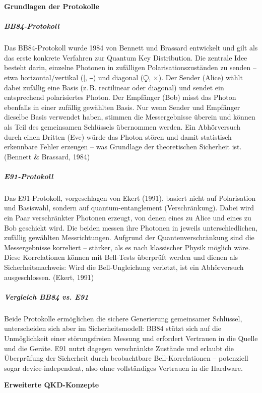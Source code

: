 \vspace{1em}
\noindent\textbf{Grundlagen der Protokolle}

\subparagraph{BB84-Protokoll}
Das BB84-Protokoll wurde 1984 von Bennett und Brassard entwickelt und gilt als das erste konkrete Verfahren zur Quantum Key Distribution. Die zentrale Idee besteht darin, einzelne Photonen in zufälligen Polarisationszuständen zu senden – etwa horizontal/vertikal (|, ⎯) und diagonal (⧬, ×).
Der Sender (Alice) wählt dabei zufällig eine Basis (z. B. rectilinear oder diagonal) und sendet ein entsprechend polarisiertes Photon. Der Empfänger (Bob) misst das Photon ebenfalls in einer zufällig gewählten Basis. Nur wenn Sender und Empfänger dieselbe Basis verwendet haben, stimmen die Messergebnisse überein und können als Teil des gemeinsamen Schlüssels übernommen werden.
Ein Abhörversuch durch einen Dritten (Eve) würde das Photon stören und damit statistisch erkennbare Fehler erzeugen – was Grundlage der theoretischen Sicherheit ist.
 (Bennett & Brassard, 1984)
 
\subparagraph{E91-Protokoll}
Das E91-Protokoll, vorgeschlagen von Ekert (1991), basiert nicht auf Polarisation und Basiswahl, sondern auf quantum-entanglement (Verschränkung). Dabei wird ein Paar verschränkter Photonen erzeugt, von denen eines zu Alice und eines zu Bob geschickt wird.
Die beiden messen ihre Photonen in jeweils unterschiedlichen, zufällig gewählten Messrichtungen. Aufgrund der Quantenverschränkung sind die Messergebnisse korreliert – stärker, als es nach klassischer Physik möglich wäre. Diese Korrelationen können mit Bell-Tests überprüft werden und dienen als Sicherheitsnachweis: Wird die Bell-Ungleichung verletzt, ist ein Abhörversuch ausgeschlossen.
(Ekert, 1991)

\subparagraph{Vergleich BB84 vs. E91}
Beide Protokolle ermöglichen die sichere Generierung gemeinsamer Schlüssel, unterscheiden sich aber im Sicherheitsmodell:
BB84 stützt sich auf die Unmöglichkeit einer störungsfreien Messung und erfordert Vertrauen in die Quelle und die Geräte.
E91 nutzt dagegen verschränkte Zustände und erlaubt die Überprüfung der Sicherheit durch beobachtbare Bell-Korrelationen – potenziell sogar device-independent, also ohne vollständiges Vertrauen in die Hardware.

\vspace{1em}
\noindent\textbf{Erweiterte QKD-Konzepte}

